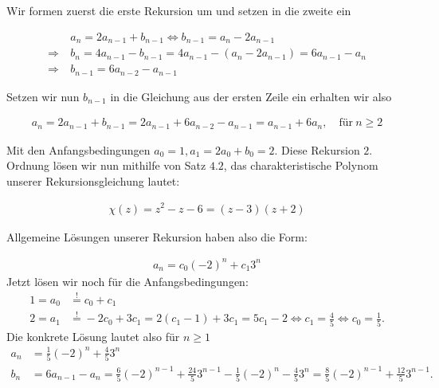\begin{solution}
	Wir formen zuerst die erste Rekursion um und setzen in die zweite ein

	\begin{align*}
	&a_n = 2a_{n-1} + b_{n-1}
	\Leftrightarrow
	b_{n-1} = a_n - 2a_{n-1} \\
	\Rightarrow~
	& b_n = 4a_{n-1} - b_{n - 1} = 4a_{n-1} - (a_n - 2a_{n-1}) = 6a_{n-1} - a_n\\
	\Rightarrow~
	&b_{n-1} = 6a_{n-2} - a_{n-1}
	\end{align*}

	Setzen wir nun $b_{n-1}$ in die Gleichung aus der ersten Zeile ein erhalten wir also

	\begin{align*}
	a_n
	= 2a_{n-1} + b_{n-1} = 2a_{n-1} + 6a_{n-2} - a_{n-1} = a_{n-1} + 6a_n , \quad \text{für}~ n \geq 2
	\end{align*}

	Mit den Anfangsbedingungen $a_0 = 1, a_1 = 2a_0 + b_0 = 2$. Diese Rekursion $2.$ Ordnung lösen wir nun mithilfe von Satz $4.2$, das charakteristische Polynom unserer Rekursionsgleichung lautet:

	\begin{align*}
	\chi(z)
	=
	z^2 - z -6 = (z - 3)(z + 2)
	\end{align*}

	Allgemeine Lösungen unserer Rekursion haben also die Form:

	\begin{align*}
	a_n
	=
	c_0 (-2)^n + c_1 3^n
	\end{align*}
  Jetzt lösen wir noch für die Anfangsbedingungen:
  \begin{align*}
    1 = a_0 &\stackrel{!}{=} c_0 + c_1 \\
    2 = a_1 &\stackrel{!}{=} -2c_0 + 3c_1 = 2(c_1 - 1) + 3c_1 = 5c_1 - 2 \iff c_1 = \frac{4}{5} \iff c_0 =
    \frac{1}{5}.
  \end{align*}
  Die konkrete Lösung lautet also für $n\geq 1$
  \begin{align*}
    a_n &= \frac{1}{5}(-2)^n + \frac{4}{5}3^n \\
    b_n &= 6a_{n-1} - a_n =
    \frac{6}{5}(-2)^{n-1} + \frac{24}{5}3^{n-1} - \frac{1}{5}(-2)^n - \frac{4}{5}3^n =
    \frac{8}{5}(-2)^{n-1} + \frac{12}{5}3^{n-1}.
  \end{align*}

\end{solution}
